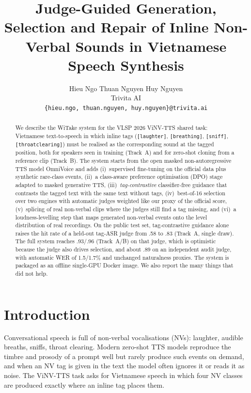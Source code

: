 \documentclass[11pt]{article}
\title{Judge-Guided Generation, Selection and Repair of Inline Non-Verbal Sounds in Vietnamese Speech Synthesis}
\author{Hieu Ngo \quad Thuan Nguyen \quad Huy Nguyen \\
  Trivita AI \\
  \texttt{\{hieu.ngo, thuan.nguyen, huy.nguyen\}@trivita.ai}}
\begin{document}
\maketitle

\begin{abstract}
We describe the WiTake system for the VLSP 2026 ViNV-TTS shared task: Vietnamese text-to-speech in which inline tags
(\texttt{[laughter]}, \texttt{[breathing]}, \texttt{[sniff]}, \texttt{[throatclearing]}) must be realised as the
corresponding sound at the tagged position, both for speakers seen in training (Track~A) and for zero-shot cloning from a
reference clip (Track~B). The system starts from the open masked non-autoregressive TTS model OmniVoice and adds
(i)~supervised fine-tuning on the official data plus synthetic rare-class events, (ii)~a class-aware preference
optimisation (DPO) stage adapted to masked generative TTS, (iii)~\emph{tag-contrastive} classifier-free guidance that
contrasts the tagged text with the same text without tags, (iv)~best-of-16 selection over two engines with automatic
judges weighted like our proxy of the official score, (v)~splicing of real non-verbal clips where the judges still find a tag
missing, and (vi)~a loudness-levelling step that maps generated non-verbal events onto the level distribution of real
recordings. On the public test set, tag-contrastive guidance alone raises the hit rate of a held-out tag-ASR judge
from .58 to .83 (Track~A, single draw). The full system reaches .93/.96 (Track~A/B) on that judge, which is optimistic
because the judge also drives selection, and about .89 on an independent audit judge, with automatic WER of
1.5/1.7\% and unchanged naturalness proxies. The system is packaged as an offline single-GPU Docker image. We also
report the many things that did not help.
\end{abstract}

\section{Introduction}

Conversational speech is full of non-verbal vocalisations (NVs): laughter, audible breaths, sniffs, throat clearing.
Modern zero-shot TTS models reproduce the timbre and prosody of a prompt well but rarely produce such events on demand,
and when an NV tag is given in the text the model often ignores it or reads it as noise. The ViNV-TTS task asks for
Vietnamese speech in which four NV classes are produced exactly where an inline tag places them.
\end{document}
